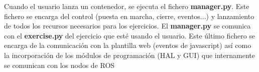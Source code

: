 Cuando el usuario lanza un contenedor, se ejecuta el fichero \textbf{manager.py}. Este fichero se encarga del control (puesta en marcha, cierre, eventos...) y lanzamiento de todos los recursos necesarios para los ejercicios. El \textbf{manager.py} se comunica con el \textbf{exercise.py} del ejercicio que esté usando el usuario. Este último fichero se encarga de la comunicación con la plantilla web (eventos de javascript) así como la incorporación de los módulos de programación (HAL y GUI) que internamente se comunican con los nodos de ROS

